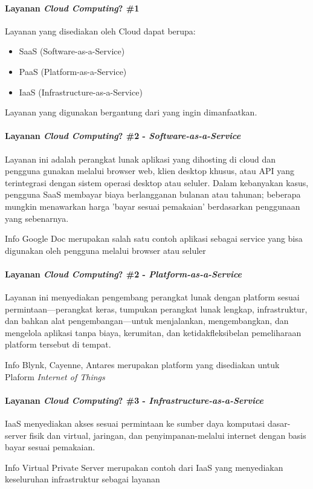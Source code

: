 \begin{frame}{\insertsectionhead}
	\framesubtitle{Layanan \textit{Cloud Computing}? \#1}
	\justifying
	Layanan yang disediakan oleh Cloud dapat berupa:
	\vfill
	\begin{itemize}
		\item SaaS (Software-as-a-Service)
		\item PaaS (Platform-as-a-Service)
		\item IaaS (Infrastructure-as-a-Service)
	\end{itemize}
	\vfill
	Layanan yang digunakan bergantung dari yang ingin dimanfaatkan.
\end{frame}

\begin{frame}{\insertsectionhead}
	\framesubtitle{Layanan \textit{Cloud Computing}? \#2 - \textit{Software-as-a-Service}}
	\justifying 
	Layanan ini adalah perangkat lunak aplikasi yang dihosting di cloud dan pengguna gunakan melalui browser web, klien desktop khusus, atau API yang terintegrasi dengan sistem operasi desktop atau seluler. 
	\vfill
	Dalam kebanyakan kasus, pengguna SaaS membayar biaya berlangganan bulanan atau tahunan; beberapa mungkin menawarkan harga 'bayar sesuai pemakaian' berdasarkan penggunaan yang sebenarnya.
	\vfill
	\begin{block}{Info}
		Google Doc merupakan salah satu contoh aplikasi sebagai service yang bisa digunakan oleh pengguna melalui browser atau seluler
	\end{block}
\end{frame}

\begin{frame}{\insertsectionhead}
	\framesubtitle{Layanan \textit{Cloud Computing}? \#2 - \textit{Platform-as-a-Service}}
	\justifying 
	Layanan ini menyediakan pengembang perangkat lunak dengan platform sesuai permintaan—perangkat keras, tumpukan perangkat lunak lengkap, infrastruktur, dan bahkan alat pengembangan—untuk menjalankan, mengembangkan, dan mengelola aplikasi tanpa biaya, kerumitan, dan ketidakfleksibelan pemeliharaan platform tersebut di tempat.
	\vfill
	\begin{block}{Info}
		Blynk, Cayenne, Antares merupakan platform yang disediakan untuk Plaform \textit{Internet of Things}
	\end{block}
\end{frame}

\begin{frame}{\insertsectionhead}
	\framesubtitle{Layanan \textit{Cloud Computing}? \#3 - \textit{Infrastructure-as-a-Service}}
	\justifying 
	IaaS menyediakan akses sesuai permintaan ke sumber daya komputasi dasar-server fisik dan virtual, jaringan, dan penyimpanan-melalui internet dengan basis bayar sesuai pemakaian.
	\vfill
	\begin{block}{Info}
		Virtual Private Server merupakan contoh dari IaaS yang menyediakan keseluruhan infrastruktur sebagai layanan
	\end{block}
\end{frame}

